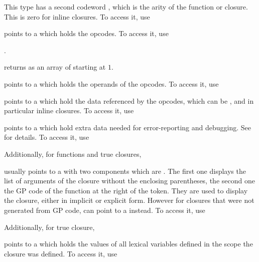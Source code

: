 This type has a second codeword , which is the arity of the
function or closure. This is zero for inline closures. To access it, use


\item {} points to a  which holds the opcodes. To access it, use

.

 returns as an array of 
starting at $1$.

\item {} points to a  which holds the operands of the opcodes.
To access it, use


\item {} points to a  which hold the data referenced by the
 opcodes, which can be , and in particular
inline closures. To access it, use


\item {} points to a  which hold extra data needed for
error-reporting and debugging. See  for details.
To access it, use


Additionally, for functions and true closures,

\item {} usually points to a  with two components which are .
The first one displays the list of arguments of the closure without the
enclosing parentheses, the second one the GP code of the function at the
right of the \kbd{->} token. They are used to display the closure, either in
implicit or explicit form. However for closures that were not generated from GP
code,  can point to a  instead. To access it, use


Additionally, for true closure,

\item {} points to a  which holds the values of all lexical
variables defined in the scope the closure was defined. To access it, use


